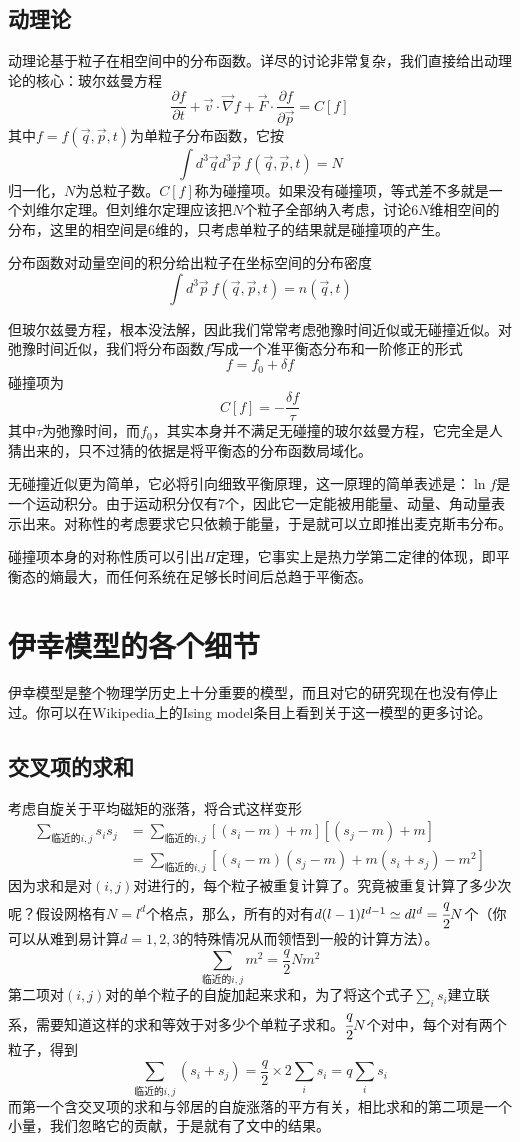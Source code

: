 \documentclass[a4paper,11pt]{ctexart}
\newcommand{\beq}{\begin{equation}}
\newcommand{\eeq}{\end{equation}}
\newcommand{\bea}{\begin{equation}\begin{aligned}}
\newcommand{\eea}{\end{aligned}\end{equation}}
\newcommand{\red}{\color{red}}
\begin{document}
\subsection{动理论}
动理论基于粒子在相空间中的分布函数。详尽的讨论非常复杂，我们直接给出动理论的核心：玻尔兹曼方程
\beq
\frac{\partial f}{\partial t} + \vec{v} \cdot \vec{\nabla} f + \vec{F} \cdot \frac{\partial f}{\partial \vec{p}} = C[f]
\eeq
其中$f = f(\vec{q},\vec{p},t)$为单粒子分布函数，它按
\beq
\int d^3 \vec{q} d^3 \vec{p}\ f(\vec{q},\vec{p},t) = N
\eeq
归一化，$N$为总粒子数。$C[f]$称为碰撞项。如果没有碰撞项，等式差不多就是一个刘维尔定理。但刘维尔定理应该把$N$个粒子全部纳入考虑，讨论$6N$维相空间的分布，这里的相空间是6维的，只考虑单粒子的结果就是碰撞项的产生。\par
分布函数对动量空间的积分给出粒子在坐标空间的分布密度
\beq
\int  d^3 \vec{p}\ f(\vec{q},\vec{p},t) = n(\vec{q},t)
\eeq
\par
但玻尔兹曼方程，{\red 根本没法解}，因此我们常常考虑弛豫时间近似或无碰撞近似。对弛豫时间近似，我们将分布函数$f$写成一个准平衡态分布和一阶修正的形式
\beq
f = f_0 + \delta f
\eeq
碰撞项为
\beq
C[f] = - \frac{\delta f}{\tau}
\eeq
其中$\tau$为弛豫时间，而$f_0$，其实本身并不满足无碰撞的玻尔兹曼方程，它完全是人猜出来的，只不过猜的依据是将平衡态的分布函数局域化。
\par
无碰撞近似更为简单，它必将引向{\red 细致平衡原理}，这一原理的简单表述是：$\ln f$是一个运动积分。由于运动积分仅有7个，因此它一定能被用能量、动量、角动量表示出来。对称性的考虑要求它只依赖于能量，于是就可以立即推出麦克斯韦分布。
\par
碰撞项本身的对称性质可以引出$H$定理，它事实上是热力学第二定律的体现，即平衡态的熵最大，而任何系统在足够长时间后总趋于平衡态。



\appendix
\section{伊幸模型的各个细节}
伊幸模型是整个物理学历史上十分重要的模型，而且对它的研究现在也没有停止过。你可以在Wikipedia上的Ising model条目上看到关于这一模型的更多讨论。
\subsection{交叉项的求和}
考虑自旋关于平均磁矩的涨落，将合式这样变形
\bea
\sum_{\text{临近的}i,j} s_i s_j &= \sum_{\text{临近的}i,j} [(s_i-m)+m][ (s_j-m)+m]\\
&= \sum_{\text{临近的}i,j}[(s_i-m)(s_j-m) +m(s_i+s_j) - m^2]
\eea
因为求和是对$(i,j)$对进行的，每个粒子被重复计算了。究竟被重复计算了多少次呢？假设网格有$N=l^d$个格点，那么，所有的对有$d(l-1)l^{d-1} \simeq dl^d=\cfrac{q}{2}N$个（你可以从难到易计算$d=1,2,3$的特殊情况从而领悟到一般的计算方法）。
\beq
\sum_{\text{临近的}i,j}m^2 =\frac{q}{2}Nm^2
\eeq
第二项对$(i,j)$对的单个粒子的自旋加起来求和，为了将这个式子$\sum_i s_i$建立联系，需要知道这样的求和等效于对多少个单粒子求和。$\cfrac{q}{2}N$个对中，每个对有两个粒子，得到
\beq
\sum_{\text{临近的}i,j} (s_i+s_j)= \frac{q}{2} \times 2 \sum_i s_i = q\sum_i s_i
\eeq
而第一个含交叉项的求和与邻居的自旋涨落的平方有关，相比求和的第二项是一个小量，我们忽略它的贡献，于是就有了文中的结果。
\end{document}
